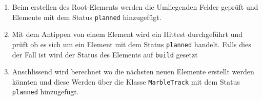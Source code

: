 \begin{description}
	\begin{enumerate}
		\item Beim erstellen des Root-Elements werden die Umliegenden Felder geprüft und Elemente mit dem Status \texttt{planned} hinzugefügt.
		\item Mit dem Antippen von einem Element wird ein Hittest durchgeführt und prüft ob es sich um ein Element mit dem Status \texttt{planned} handelt. Falls dies der Fall ist wird der Status des Elements auf \texttt{build} gesetzt
		\item Anschlissend wird berechnet wo die nächsten neuen Elemente erstellt werden könnten und diese Werden über die Klasse \texttt{MarbleTrack} mit dem Status \texttt{planned} hinzugefügt.
	\end{enumerate}
	
\end{description}
